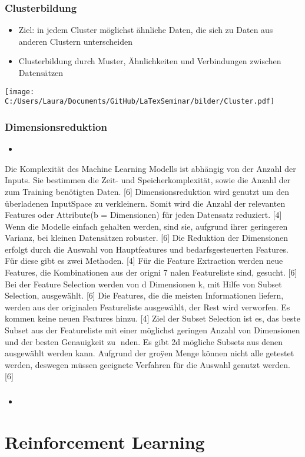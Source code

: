 \documentclass[11pt]{beamer}
\begin{document}
	\begin{frame}
		\frametitle{Clusterbildung}
		\begin{itemize}
			\item Ziel: in jedem Cluster möglichst ähnliche Daten, die sich zu Daten aus anderen Clustern unterscheiden
			\item Clusterbildung durch Muster, Ähnlichkeiten und Verbindungen zwischen Datensätzen
		\end{itemize}
		\texttt{[image: C:/Users/Laura/Documents/GitHub/LaTexSeminar/bilder/Cluster.pdf]}
	\end{frame}
	
	\begin{frame}
		\frametitle{Dimensionsreduktion}
		\begin{itemize}
			\item 
		\end{itemize}
		Die Komplexität des Machine Learning Modells ist abhängig von der Anzahl der Inputs. Sie bestimmen die Zeit- und Speicherkomplexität, sowie die Anzahl der zum Training benötigten Daten. [6] Dimensionsreduktion wird genutzt um den überladenen InputSpace zu verkleinern. Somit wird die Anzahl der relevanten Features oder Attribute(b = Dimensionen) für jeden Datensatz reduziert. [4] Wenn die Modelle einfach gehalten werden, sind sie, aufgrund ihrer geringeren Varianz, bei kleinen Datensätzen robuster. [6] Die Reduktion der Dimensionen erfolgt durch die Auswahl von Hauptfeatures und bedarfsgesteuerten Features. Für diese gibt es zwei Methoden. [4] Für die Feature Extraction werden neue Features, die Kombinationen aus der origni
		7
		nalen Featureliste sind, gesucht. [6] Bei der Feature Selection werden von d Dimensionen k, mit Hilfe von Subset Selection, ausgewählt. [6] Die Features, die die meisten Informationen liefern, werden aus der originalen Featureliste ausgewählt, der Rest wird verworfen. Es kommen keine neuen Features hinzu. [4] Ziel der Subset Selection ist es, das beste Subset aus der Featureliste mit einer möglichst geringen Anzahl von Dimensionen und der besten Genauigkeit zu nden. Es gibt 2d mögliche Subsets aus denen ausgewählt werden kann. Aufgrund der groÿen Menge können nicht alle getestet werden, deswegen müssen geeignete Verfahren für die Auswahl genutzt werden. [6]
		
	\end{frame}
	
	\begin{frame}
		\frametitle{}
		\begin{itemize}
			\item 
		\end{itemize}
	\end{frame}
	
	\section{Reinforcement Learning}
	
	\begin{frame}
		
	\end{frame}
	
\end{document}
